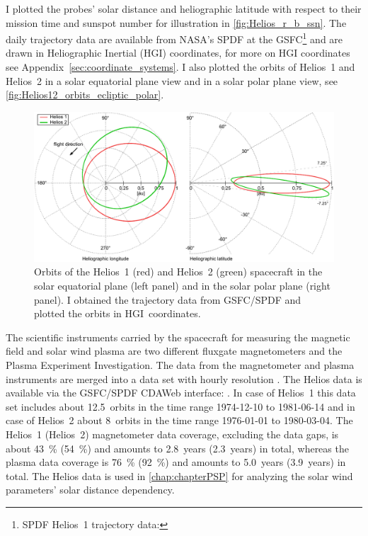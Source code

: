 I plotted the probes' solar distance and heliographic latitude with respect to their mission time and sunspot number for illustration in \autoref{fig:Helios_r_b_ssn}. The daily trajectory data are available from NASA's SPDF at the GSFC\protect\footnote{SPDF Helios~1 trajectory data: } and are drawn in Heliographic Inertial (HGI) coordinates, for more on HGI coordinates see Appendix~\ref{sec:coordinate_systems}. I also plotted the orbits of Helios~1 and Helios~2 in a solar equatorial plane view and in a solar polar plane view, see \autoref{fig:Helios12_orbits_ecliptic_polar}.
\begin{figure}[t]
	\centering
	\includegraphics[width=\textwidth]{figures_of_mine/gnuplots/Helios12_orbits_ecliptic_polar.pdf}
	\caption[I created the figure myself.]
	{Orbits of the Helios~1 (red) and Helios~2 (green) spacecraft in the solar equatorial plane (left panel) and in the solar polar plane (right panel). I obtained the trajectory data from GSFC/SPDF and plotted the orbits in HGI~coordinates.}
	\label{fig:Helios12_orbits_ecliptic_polar}
\end{figure}

The scientific instruments carried by the spacecraft for measuring the magnetic field and solar wind plasma are two different fluxgate magnetometers and the Plasma Experiment Investigation. The data from the magnetometer and plasma instruments are merged into a data set with hourly resolution \citep{Rosenbauer1977}. The Helios data is available via the GSFC/SPDF CDAWeb interface: . In case of Helios~1 this data set includes about 12.5~orbits in the time range \mbox{1974-12-10} to \mbox{1981-06-14} and in case of Helios~2 about 8~orbits in the time range \mbox{1976-01-01} to \mbox{1980-03-04}. The Helios~1 (Helios~2) magnetometer data coverage, excluding the data gaps, is about \SI{43}{\%} (\SI{54}{\%}) and amounts to 2.8~years (2.3~years) in total, whereas the plasma data coverage is \SI{76}{\%} (\SI{92}{\%}) and amounts to 5.0~years (3.9~years) in total.
The Helios data is used in \autoref{chap:chapterPSP} for analyzing the solar wind parameters' solar distance dependency.

